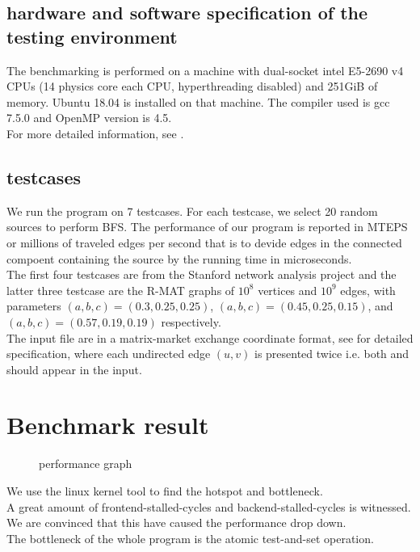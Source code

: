 \documentclass{article}
\newcommand{\reportSection}[1]{
   \section{#1}
   \rhead{section \emph{#1}}
}
\begin{document}
\subsection{hardware and software specification of the testing environment}

The benchmarking is performed on a machine with dual-socket intel E5-2690 v4 CPUs (14 physics core each CPU, hyperthreading disabled) and 251GiB of memory.
Ubuntu 18.04 is installed on that machine.  The compiler used is gcc 7.5.0 and OpenMP version is 4.5.\\
For more detailed information, see .

\subsection{testcases}

We run the program on 7 testcases.
For each testcase, we select 20 random sources to perform BFS.
The performance of our program is reported in MTEPS or millions of traveled edges per second that is to devide edges in the connected compoent containing the source by the running time in microseconds.\\

The first four testcases are from the Stanford network analysis project \cite{snapnets}
and the latter three testcase are the R-MAT \cite{khorasani2015parmat} graphs of $10^8$ vertices and $10^9$ edges, with parameters $(a,b,c)=(0.3,0.25,0.25)$, $(a,b,c)=(0.45,0.25,0.15)$, and $(a,b,c)=(0.57,0.19,0.19)$ respectively.\\

The input file are in a matrix-market exchange coordinate format, see \cite{matrixmarket} for detailed specification, where each undirected edge $(u,v)$ is presented twice i.e. both  and  should appear in the input.

\reportSection{Benchmark result}

\begin{figure}
	\caption{performance graph}
	\label{fig:qwq}
\end{figure}

We use the linux kernel tool \cite{linuxperf} to find the hotspot and bottleneck.\\
A great amount of frontend-stalled-cycles and backend-stalled-cycles is witnessed. We are convinced that this have caused the performance drop down.\\
The bottleneck of the whole program is the atomic test-and-set operation.\\
\end{document}
